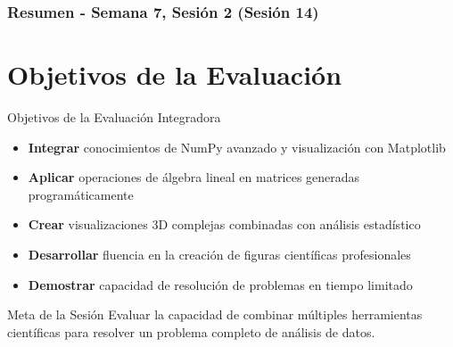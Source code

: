 \documentclass[10pt]{beamer}
\begin{document}
\myfront{}

\begin{frame}
  \titlepage
\end{frame}

\begin{frame}
  \frametitle{Resumen - Semana 7, Sesión 2 (Sesión 14)}
  \tableofcontents
\end{frame}


\section{Objetivos de la Evaluación}

\begin{frame}{Objetivos de la Evaluación Integradora}
  \begin{itemize}
    \item \textbf{Integrar} conocimientos de NumPy avanzado y visualización con Matplotlib
    \item \textbf{Aplicar} operaciones de álgebra lineal en matrices generadas programáticamente
    \item \textbf{Crear} visualizaciones 3D complejas combinadas con análisis estadístico
    \item \textbf{Desarrollar} fluencia en la creación de figuras científicas profesionales
    \item \textbf{Demostrar} capacidad de resolución de problemas en tiempo limitado
  \end{itemize}
  
  \begin{alertblock}{Meta de la Sesión}
    Evaluar la capacidad de combinar múltiples herramientas científicas para resolver un problema completo de análisis de datos.
  \end{alertblock}
\end{frame}
\end{document}
